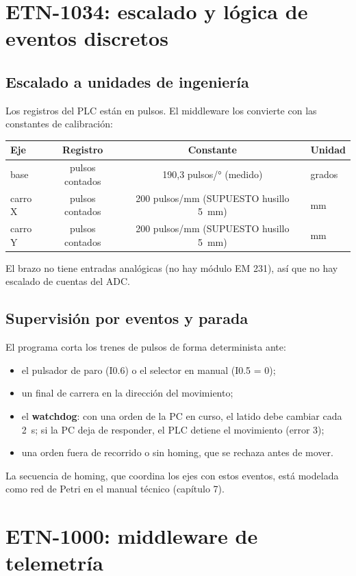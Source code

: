 \documentclass[a4paper,11pt]{article}
\begin{document}
\section{ETN-1034: escalado y lógica de eventos discretos}
\subsection{Escalado a unidades de ingeniería}
Los registros del PLC están en pulsos. El middleware los convierte con las constantes de calibración:
\begin{center}\small
\begin{tabular}{l c c l}
\toprule
\textbf{Eje} & \textbf{Registro} & \textbf{Constante} & \textbf{Unidad}\\
\midrule
base & pulsos contados & 190,3 pulsos/° (medido) & grados\\
carro X & pulsos contados & 200 pulsos/mm (SUPUESTO husillo 5~mm) & mm\\
carro Y & pulsos contados & 200 pulsos/mm (SUPUESTO husillo 5~mm) & mm\\
\bottomrule
\end{tabular}
\end{center}
El brazo no tiene entradas analógicas (no hay módulo EM 231), así que no hay escalado de cuentas del ADC.

\subsection{Supervisión por eventos y parada}
El programa  corta los trenes de pulsos de forma determinista ante:
\begin{itemize}
\item el pulsador de paro (I0.6) o el selector en manual (I0.5 = 0);
\item un final de carrera en la dirección del movimiento;
\item el \textbf{watchdog}: con una orden de la PC en curso, el latido  debe cambiar cada 2~s; si la PC deja de responder, el PLC detiene el movimiento (error 3);
\item una orden fuera de recorrido o sin homing, que se rechaza antes de mover.
\end{itemize}
La secuencia de homing, que coordina los ejes con estos eventos, está modelada como red de Petri en el manual técnico (capítulo 7).

\section{ETN-1000: middleware de telemetría}
\end{document}
